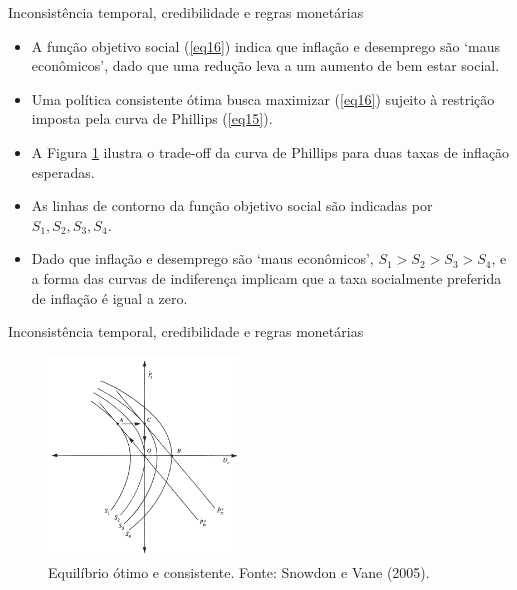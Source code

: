 \documentclass[10pt]{beamer}
\begin{document}
\begin{frame}{Inconsistência temporal, credibilidade e regras monetárias}
    \begin{itemize}
        \item A função objetivo social (\ref{eq16}) indica que inflação e desemprego são `maus econômicos', dado que uma redução leva a um aumento de bem estar social.
        \bigskip
        \item Uma política consistente ótima busca maximizar (\ref{eq16}) sujeito à restrição imposta pela curva de Phillips (\ref{eq15}).
        \bigskip
        \item A Figura \ref{fig2} ilustra o trade-off da curva de Phillips para duas taxas de inflação esperadas.
        \bigskip
        \item As linhas de contorno da função objetivo social são indicadas por $S_1, S_2, S_3, S_4$.
        \bigskip
        \item Dado que inflação e desemprego são `maus econômicos', $S_1>S_2>S_3>S_4$, e a forma das curvas de indiferença implicam que a taxa socialmente preferida de inflação é igual a zero.
    \end{itemize}
\end{frame}

\begin{frame}{Inconsistência temporal, credibilidade e regras monetárias}
    \begin{figure}
        \centering
        \includegraphics[width=0.45\textwidth]{./figures/aula12_fig2.PNG}
        \caption{Equilíbrio ótimo e consistente. Fonte: Snowdon e Vane (2005).}
        \label{fig2}
    \end{figure}
\end{frame}
\end{document}
